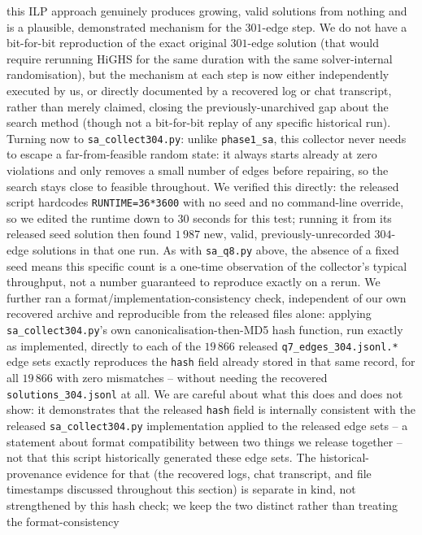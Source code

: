 \documentclass[12pt,a4paper]{article}
\theoremstyle{definition}
\begin{document}
this ILP approach genuinely produces growing, valid solutions from
nothing and is a plausible, demonstrated mechanism for the $301$-edge
step. We do not have a bit-for-bit reproduction of the exact original
$301$-edge solution (that would require rerunning HiGHS for the same
duration with the same solver-internal randomisation), but the
mechanism at each step is now either independently executed by us, or directly documented by a
recovered log or chat transcript, rather than merely claimed, closing the previously-unarchived
gap about the search method (though not a bit-for-bit
replay of any specific historical run). Turning now to
\texttt{sa\_collect304.py}: unlike
\texttt{phase1\_sa}, this collector never needs to escape a
far-from-feasible random state: it always starts already at zero
violations and only removes a small number of edges before repairing,
so the search stays close to feasible throughout. We verified this
directly: the released script hardcodes \texttt{RUNTIME=36*3600} with
no seed and no command-line override, so we edited the runtime down
to $30$ seconds for this test; running it from its
released seed solution then found $1\,987$ new, valid,
previously-unrecorded $304$-edge solutions in that one run. As with
\texttt{sa\_q8.py} above, the absence of a fixed seed means this
specific count is a one-time observation of the collector's typical
throughput, not a number guaranteed to reproduce exactly on a rerun.
We further ran a
format/implementation-consistency check, independent of our own
recovered archive and
reproducible from the released files alone: applying
\texttt{sa\_collect304.py}'s own canonicalisation-then-MD5 hash
function, run exactly as implemented, directly
to each of the $19\,866$ released
\texttt{q7\_edges\_304.jsonl.*} edge sets exactly reproduces the
\texttt{hash} field already stored in that same record, for all
$19\,866$ with zero mismatches -- without needing the recovered
\texttt{solutions\_304.jsonl} at all. We are careful about what this
does and does not show: it demonstrates that the released
\texttt{hash} field is internally consistent with the released
\texttt{sa\_collect304.py} implementation applied to the released edge
sets -- a statement about format compatibility between two things we
release together -- not that this script historically generated these
edge sets. The historical-provenance evidence for that (the recovered
logs, chat transcript, and file timestamps discussed throughout this
section) is separate in kind, not strengthened by this hash check;
we keep the two distinct rather than treating the format-consistency
\end{document}
